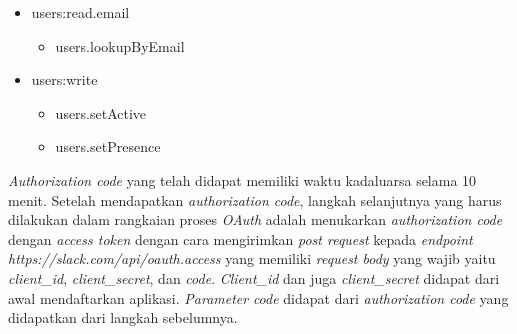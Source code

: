 \begin{multicols}{2}
\begin{itemize}
	\item users:read.email
	\begin{itemize}
		\item users.lookupByEmail
	\end{itemize}
	
	\item users:write
	\begin{itemize}
		\item users.setActive
		\item users.setPresence
	\end{itemize}
\end{itemize}
\end{multicols}

\textit{Authorization code} yang telah didapat memiliki waktu kadaluarsa selama 10 menit. Setelah mendapatkan \textit{authorization code}, langkah selanjutnya yang harus dilakukan dalam rangkaian proses \textit{OAuth} adalah menukarkan \textit{authorization code} dengan \textit{access token} dengan cara mengirimkan \textit{post request} kepada \textit{endpoint} \textit{https://slack.com/api/oauth.access} yang memiliki \textit{request body} yang wajib yaitu \textit{client\_id}, \textit{client\_secret}, dan \textit{code}. \textit{Client\_id} dan juga \textit{client\_secret} didapat dari awal mendaftarkan aplikasi. \textit{Parameter} \textit{code} didapat dari \textit{authorization code} yang didapatkan dari langkah sebelumnya.

